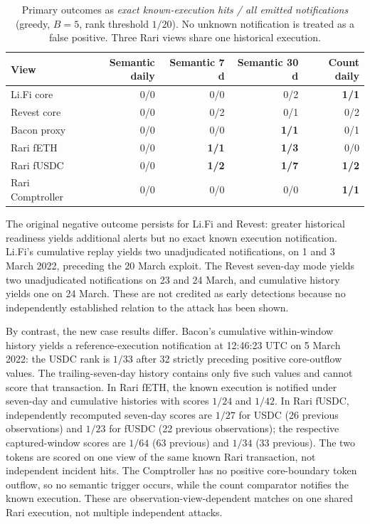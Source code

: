 \documentclass[preprint,12pt,authoryear]{elsarticle}
\begin{document}
\begin{table}[htbp]
\centering\scriptsize
\caption{Primary outcomes as \emph{exact known-execution hits / all emitted notifications} (greedy, $B=5$, rank threshold $1/20$). No unknown notification is treated as a false positive. Three Rari views share one historical execution.}
\label{tab:outcomes}
\begin{tabular}{lrrrr}
\toprule
View & Semantic daily & Semantic 7 d & Semantic 30 d & Count daily \\
\midrule
Li.Fi core & 0/0 & 0/0 & 0/2 & \textbf{1/1} \\
Revest core & 0/0 & 0/2 & 0/1 & 0/2 \\
Bacon proxy & 0/0 & 0/0 & \textbf{1/1} & 0/1 \\
Rari fETH & 0/0 & \textbf{1/1} & \textbf{1/3} & 0/0 \\
Rari fUSDC & 0/0 & \textbf{1/2} & \textbf{1/7} & \textbf{1/2} \\
Rari Comptroller & 0/0 & 0/0 & 0/0 & \textbf{1/1} \\
\bottomrule
\end{tabular}
\end{table}

The original negative outcome persists for Li.Fi and Revest: greater historical readiness yields additional alerts but no exact known execution notification. Li.Fi's cumulative replay yields two unadjudicated notifications, on 1 and 3 March 2022, preceding the 20 March exploit. The Revest seven-day mode yields two unadjudicated notifications on 23 and 24 March, and cumulative history yields one on 24 March. These are not credited as early detections because no independently established relation to the attack has been shown.

By contrast, the new case results differ. Bacon's cumulative within-window history yields a reference-execution notification at 12:46:23 UTC on 5 March 2022: the USDC rank is $1/33$ after 32 strictly preceding positive core-outflow values. The trailing-seven-day history contains only five such values and cannot score that transaction. In Rari fETH, the known execution is notified under seven-day and cumulative histories with scores $1/24$ and $1/42$. In Rari fUSDC, independently recomputed seven-day scores are $1/27$ for USDC (26 previous observations) and $1/23$ for fUSDC (22 previous observations); the respective captured-window scores are $1/64$ (63 previous) and $1/34$ (33 previous). The two tokens are scored on one view of the same known Rari transaction, not independent incident hits. The Comptroller has no positive core-boundary token outflow, so no semantic trigger occurs, while the count comparator notifies the known execution. These are observation-view-dependent matches on one shared Rari execution, not multiple independent attacks.
\end{document}
